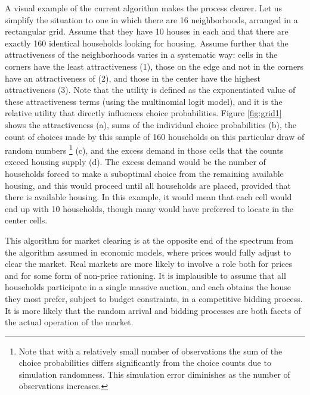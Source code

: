 \documentclass[12pt,a4paper]{article}
\begin{document}
A visual example of the current algorithm makes the process
clearer. Let us simplify the situation to one in which there are
16 neighborhoods, arranged in a rectangular grid.  Assume that
they have 10 houses in each and that there are exactly 160
identical households looking for housing.  Assume further that the
attractiveness of the neighborhoods varies in a systematic way:
cells in the corners have the least attractiveness (1), those on
the edge and not in the corners have an attractiveness of (2), and
those in the center have the highest attractiveness (3).  Note
that the utility is defined as the exponentiated value of these
attractiveness terms (using the multinomial logit model), and it
is the relative utility that directly influences choice
probabilities. Figure \ref{fig:grid1} shows the attractiveness
(a), sums of the individual choice probabilities (b), the count of
choices made by this sample of 160 households on this particular
draw of random numbers \footnote{Note that with a relatively small
number of observations the sum of the choice probabilities differs
significantly from the choice counts due to simulation randomness.
This simulation error diminishes as the number of observations
increases.} (c), and the excess demand in those cells that the
counts exceed housing supply (d).  The excess demand would be the
number of households forced to make a suboptimal choice from the
remaining available housing, and this would proceed until all
households are placed, provided that there is available housing.
In this example, it would mean that each cell would end up with 10
households, though many would have preferred to locate in the
center cells.

This algorithm for market clearing is at the opposite end of the
spectrum from the algorithm assumed in economic models, where prices
would fully adjust to clear the market.  Real markets are more
likely to involve a role both for prices and for some form of
non-price rationing. It is implausible to assume that all
households participate in a single massive auction, and each obtains
the house they most prefer, subject to budget constraints, in a
competitive bidding process. It is more likely that the random
arrival and bidding processes are both facets of the actual
operation of the market.
\end{document}

